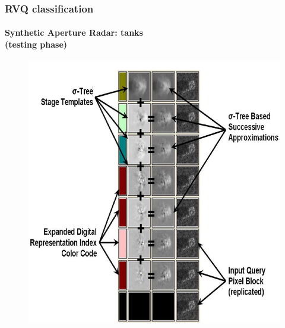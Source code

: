 \begin{frame}
\begin{figure}
	\end{figure}
\end{frame}




\begin{frame}
\frametitle{RVQ classification}
\framesubtitle{\small Synthetic Aperture Radar: tanks\\(testing phase)}
\logoCSIPCPL\mypagenum
	\begin{figure}		
		\includegraphics[height=0.8\textheight]{figs/RVQ_SARtank_3_reconstruction.png}			
	\end{figure}
\end{frame}




